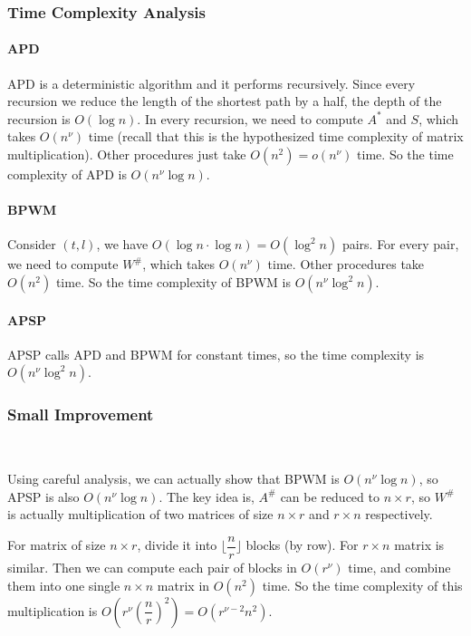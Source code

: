 \documentclass[12pt]{article}
\theoremstyle{plain}
\begin{document}
\subsubsection{Time Complexity Analysis}

\paragraph{APD} APD is a deterministic algorithm and it performs recursively. Since every recursion we reduce the length of the shortest path by a half, the depth of the recursion is $O(\log n)$. In every recursion, we need to compute $A^*$ and $S$, which takes $O(n^{\nu})$ time (recall that this is the hypothesized time complexity of matrix multiplication). Other procedures just take $O(n^2)=o(n^{\nu})$ time. So the time complexity of APD is $O(n^{\nu}\log n)$.

\paragraph{BPWM} Consider $(t,l)$, we have $O(\log n\cdot \log n)=O(\log^2 n)$ pairs. For every pair, we need to compute $W^{\#}$, which takes $O(n^{\nu})$ time. Other procedures take $O(n^2)$ time. So the time complexity of BPWM is $O(n^{\nu}\log^2 n)$.

\paragraph{APSP} APSP calls APD and BPWM for constant times, so the time complexity is $O(n^{\nu}\log^2 n)$.

\subsubsection{Small Improvement}
\label{imp}\

Using careful analysis, we can actually show that BPWM is $O(n^\nu \log n)$, so APSP is also $O(n^\nu \log n)$. The key idea is, $A^\#$ can be reduced to $n\times r$, so $W^\#$ is actually multiplication of two matrices of size $n\times r$ and $r\times n$ respectively.

For matrix of size $n\times r$, divide it into $\lfloor\dfrac{n}{r}\rfloor$ blocks (by row). For $r\times n$ matrix is similar. Then we can compute each pair of blocks in $O(r^{\nu})$ time, and combine them into one single $n\times n$ matrix in $O(n^2)$ time. So the time complexity of this multiplication is $O(r^\nu(\dfrac{n}{r})^2)=O(r^{\nu-2}n^2)$.
\end{document}
